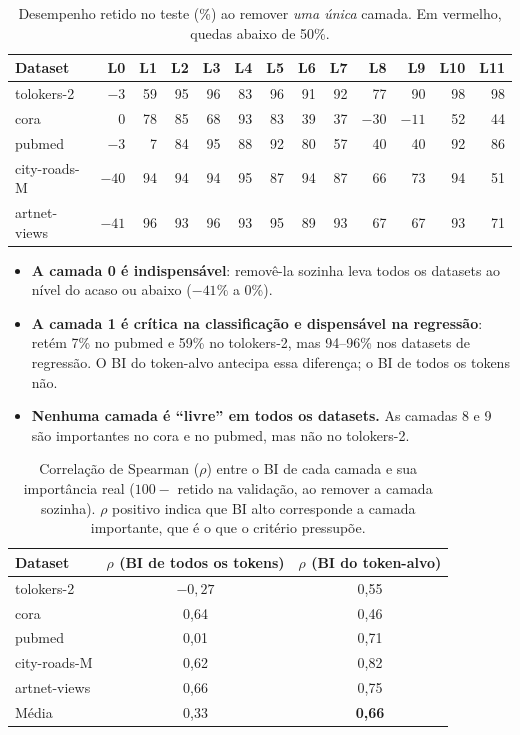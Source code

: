 \documentclass[11pt,a4paper]{article}
\newcommand{\bom}[1]{\textbf{#1}}
\newcommand{\ruim}[1]{\textcolor{red!70!black}{#1}}
\begin{document}
\begin{table}[H]
\centering
\caption{Desempenho retido no teste (\%) ao remover \emph{uma única} camada. Em vermelho, quedas abaixo de 50\%.}
\label{tab:loo}
\setlength{\tabcolsep}{4pt}
\small
\begin{tabular}{@{}l*{12}{r}@{}}
\toprule
Dataset & L0 & L1 & L2 & L3 & L4 & L5 & L6 & L7 & L8 & L9 & L10 & L11 \\
\midrule
tolokers-2   & \ruim{$-3$}  & 59 & 95 & 96 & 83 & 96 & 91 & 92 & 77 & 90 & 98 & 98 \\
cora         & \ruim{0}     & 78 & 85 & 68 & 93 & 83 & \ruim{39} & \ruim{37} & \ruim{$-30$} & \ruim{$-11$} & 52 & \ruim{44} \\
pubmed       & \ruim{$-3$}  & \ruim{7} & 84 & 95 & 88 & 92 & 80 & 57 & \ruim{40} & \ruim{40} & 92 & 86 \\
city-roads-M & \ruim{$-40$} & 94 & 94 & 94 & 95 & 87 & 94 & 87 & 66 & 73 & 94 & 51 \\
artnet-views & \ruim{$-41$} & 96 & 93 & 96 & 93 & 95 & 89 & 93 & 67 & 67 & 93 & 71 \\
\bottomrule
\end{tabular}
\end{table}

\begin{itemize}
  \item \textbf{A camada 0 é indispensável}: removê-la sozinha leva todos os datasets ao nível do acaso ou abaixo ($-41\%$ a 0\%).
  \item \textbf{A camada 1 é crítica na classificação e dispensável na regressão}: retém 7\% no pubmed e 59\% no tolokers-2, mas 94--96\% nos datasets de regressão. O BI do token-alvo antecipa essa diferença; o BI de todos os tokens não.
  \item \textbf{Nenhuma camada é ``livre'' em todos os datasets.} As camadas 8 e 9 são importantes no cora e no pubmed, mas não no tolokers-2.
\end{itemize}

\begin{table}[H]
\centering
\caption{Correlação de Spearman ($\rho$) entre o BI de cada camada e sua importância real ($100 -$ retido na validação, ao remover a camada sozinha). $\rho$ positivo indica que BI alto corresponde a camada importante, que é o que o critério pressupõe.}
\label{tab:corr}
\begin{tabular}{@{}lcc@{}}
\toprule
Dataset & $\rho$ (BI de todos os tokens) & $\rho$ (BI do token-alvo) \\
\midrule
tolokers-2   & \ruim{$-0{,}27$} & 0,55 \\
cora         & 0,64  & 0,46 \\
pubmed       & 0,01  & 0,71 \\
city-roads-M & 0,62  & 0,82 \\
artnet-views & 0,66  & 0,75 \\
\midrule
Média        & 0,33  & \bom{0,66} \\
\bottomrule
\end{tabular}
\end{table}
\end{document}
